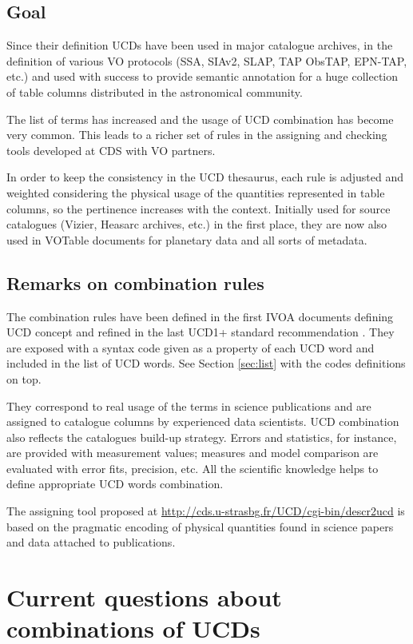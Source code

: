 \documentclass[11pt,a4paper]{ivoa}
\begin{document}
\subsection{Goal}
Since their definition UCDs have been used in major catalogue archives, in the definition of various
VO protocols (SSA, SIAv2, SLAP, TAP ObsTAP, EPN-TAP, etc.) and used with success to provide semantic
annotation for a huge collection of table columns distributed in the astronomical community.

The list of terms has increased and the usage of UCD combination has become very common. This leads
to a richer set of rules in the assigning and checking tools developed at CDS with VO partners.

In order to keep the consistency in the UCD thesaurus, each rule is adjusted and weighted considering 
the physical usage of the quantities represented in table columns, so the pertinence increases with 
the context. Initially used for source catalogues (Vizier, Heasarc archives, etc.) in the first place, 
they are now also used in VOTable documents for planetary data \citep{2022ivoa.spec.0822E} and all sorts of metadata.

\subsection{Remarks on combination rules}
The combination rules have been defined in the first IVOA documents defining UCD concept
\citep{2005ivoa.spec.0819D} and refined in the last UCD1+ standard recommendation \citep{2018ivoa.spec.0527P}. 
They are exposed with a syntax code given as a property of each UCD word 
and included in the list of UCD words. See Section \ref{sec:list} with the codes definitions on top.

They correspond to real usage of the terms in science publications and are
assigned to catalogue columns by experienced data scientists.
UCD combination also reflects the catalogues 
build-up strategy. Errors and statistics, for instance, are provided with measurement values; measures 
and model comparison are evaluated with error fits, precision, etc. All the scientific knowledge helps 
to define appropriate UCD words combination.

The assigning tool proposed at \url{http://cds.u-strasbg.fr/UCD/cgi-bin/descr2ucd} is based on the
pragmatic encoding of physical quantities found in science papers and data attached to publications.

\section{Current questions about combinations of UCDs}
\end{document}

